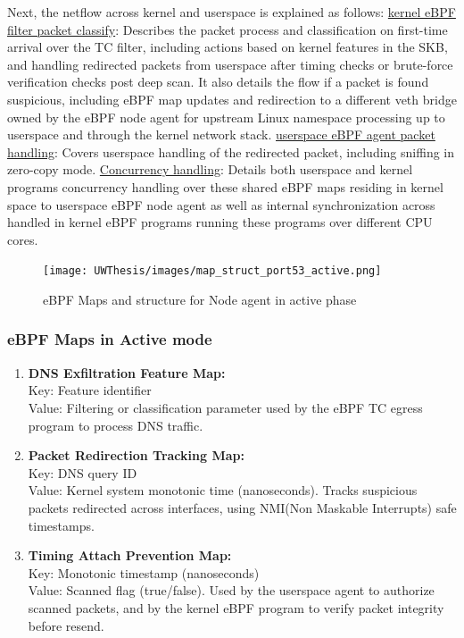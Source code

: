 \documentclass [11pt, proquest] {uwthesis}[2020/02/24]
\begin{document}
Next, the netflow across kernel and userspace is explained as follows:
\hyperref[active:sec1]{kernel eBPF filter packet classify}: Describes the packet process and classification on first-time arrival over the TC filter, including actions based on kernel features in the SKB, and handling redirected packets from userspace after timing checks or brute-force verification checks post deep scan. It also details the flow if a packet is found suspicious, including eBPF map updates and redirection to a different veth bridge owned by the eBPF node agent for upstream Linux namespace processing up to userspace and through the kernel network stack.  
\hyperref[active:sec3]{userspace eBPF agent packet handling}: Covers userspace handling of the redirected packet, including sniffing in zero-copy mode.
\hyperref[active:sec3]{Concurrency handling}: Details both userspace and kernel programs concurrency handling over these shared eBPF maps residing in kernel space to userspace eBPF node agent as well as internal synchronization across handled in kernel eBPF programs running these programs over different CPU cores.


\begin{figure}[H]
\centering
\texttt{[image: UWThesis/images/map\_struct\_port53\_active.png]}
\caption{eBPF Maps and structure for Node agent in active phase}
\label{sec:dp_eBPF_LRU_Maps_active}
\end{figure}

\subsubsection{\textbf{eBPF Maps in Active mode}}
\begin{enumerate}[itemsep=1pt,parsep=0pt]
\label{sec:maps}
\item \textbf{DNS Exfiltration Feature Map:} \\
Key: Feature identifier \\
Value: Filtering or classification parameter used by the eBPF TC egress program to process DNS traffic.

\item \textbf{Packet Redirection Tracking Map:} \\
Key: DNS query ID \\
Value: Kernel system monotonic time (nanoseconds). Tracks suspicious packets redirected across interfaces, using NMI(Non Maskable Interrupts) safe timestamps.

\item \textbf{Timing Attach Prevention Map:} \\
Key: Monotonic timestamp (nanoseconds) \\
Value: Scanned flag (true/false). Used by the userspace agent to authorize scanned packets, and by the kernel eBPF program to verify packet integrity before resend.
\end{enumerate}
\end{document}
